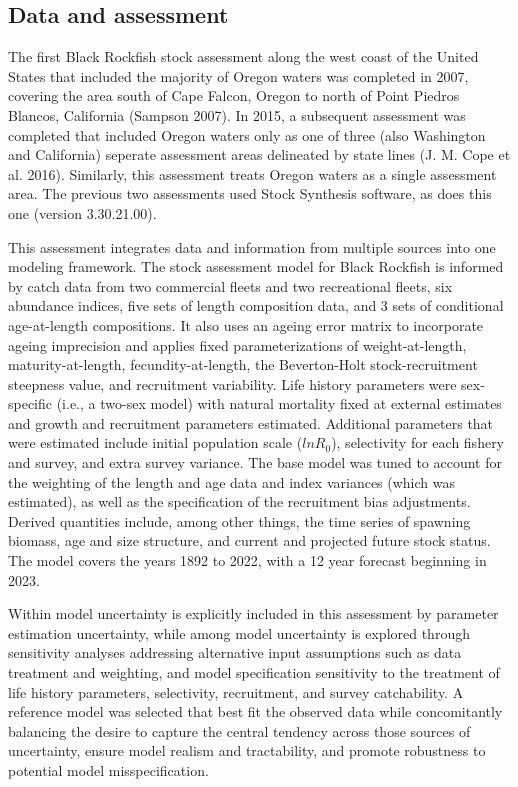 \documentclass[11pt,
  english,
  letterpaper,
]{article}
\begin{document}
\clearpage

\hypertarget{data-and-assessment}{%
\subsection*{Data and assessment}\label{data-and-assessment}}

The first Black Rockfish stock assessment along the west coast of the United States that included the majority of Oregon waters was completed in 2007, covering the area south of Cape Falcon, Oregon to north of Point Piedros Blancos, California (Sampson 2007). In 2015, a subsequent assessment was completed that included Oregon waters only as one of three (also Washington and California) seperate assessment areas delineated by state lines (J. M. Cope et al. 2016). Similarly, this assessment treats Oregon waters as a single assessment area. The previous two assessments used Stock Synthesis software, as does this one (version 3.30.21.00).

This assessment integrates data and information from multiple sources into one modeling framework. The stock assessment model for Black Rockfish is informed by catch data from two commercial fleets and two recreational fleets, six abundance indices, five sets of length composition data, and 3 sets of conditional age-at-length compositions. It also uses an ageing error matrix to incorporate ageing imprecision and applies fixed parameterizations of weight-at-length, maturity-at-length, fecundity-at-length, the Beverton-Holt stock-recruitment steepness value, and recruitment variability. Life history parameters were sex-specific (i.e., a two-sex model) with natural mortality fixed at external estimates and growth and recruitment parameters estimated. Additional parameters that were estimated include initial population scale (\(lnR_0\)), selectivity for each fishery and survey, and extra survey variance. The base model was tuned to account for the weighting of the length and age data and index variances (which was estimated), as well as the specification of the recruitment bias adjustments. Derived quantities include, among other things, the time series of spawning biomass, age and size structure, and current and projected future stock status. The model covers the years 1892 to 2022, with a 12 year forecast beginning in 2023.

Within model uncertainty is explicitly included in this assessment by parameter estimation uncertainty, while among model uncertainty is explored through sensitivity analyses addressing alternative input assumptions such as data treatment and weighting, and model specification sensitivity to the treatment of life history parameters, selectivity, recruitment, and survey catchability. A reference model was selected that best fit the observed data while concomitantly balancing the desire to capture the central tendency across those sources of uncertainty, ensure model realism and tractability, and promote robustness to potential model misspecification.
\end{document}
